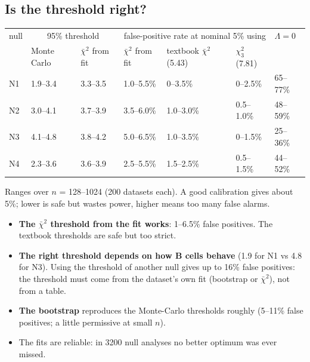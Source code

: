 \documentclass[10pt,a4paper]{article}
\begin{document}
\subsection{Is the threshold right?}
\begin{center}\footnotesize\setlength{\tabcolsep}{3pt}
\begin{tabular}{@{}lllllll@{}}\toprule
null & \multicolumn{2}{c}{95\% threshold} & \multicolumn{3}{c}{false-positive rate at nominal 5\% using} & $\Lambda = 0$ \\
 & Monte Carlo & $\bar\chi^2$ from fit & $\bar\chi^2$ from fit & textbook $\bar\chi^2$ (5.43) & $\chi^2_3$ (7.81) & \\\midrule
N1 & 1.9--3.4 & 3.3--3.5 & 1.0--5.5\% & 0--3.5\% & 0--2.5\% & 65--77\% \\
N2 & 3.0--4.1 & 3.7--3.9 & 3.5--6.0\% & 1.0--3.0\% & 0.5--1.0\% & 48--59\% \\
N3 & 4.1--4.8 & 3.8--4.2 & 5.0--6.5\% & 1.0--3.5\% & 0--1.5\% & 25--36\% \\
N4 & 2.3--3.6 & 3.6--3.9 & 2.5--5.5\% & 1.5--2.5\% & 0.5--1.5\% & 44--52\% \\\bottomrule
\end{tabular}

Ranges over $n$ = 128--1024 (200 datasets each). A good calibration gives about 5\%; lower is safe but wastes power, higher means too many false alarms.
\end{center}
\begin{itemize}
\item \textbf{The $\bar\chi^2$ threshold from the fit works}: 1--6.5\% false positives. The textbook thresholds are safe but too strict.
\item \textbf{The right threshold depends on how B cells behave} (1.9 for N1 vs 4.8 for N3). Using the threshold of another null gives up to 16\% false positives: the threshold must come from the dataset's own fit (bootstrap or $\bar\chi^2$), not from a table.
\item \textbf{The bootstrap} reproduces the Monte-Carlo thresholds roughly (5--11\% false positives; a little permissive at small $n$).
\item The fits are reliable: in 3200 null analyses no better optimum was ever missed.
\end{itemize}
\end{document}
